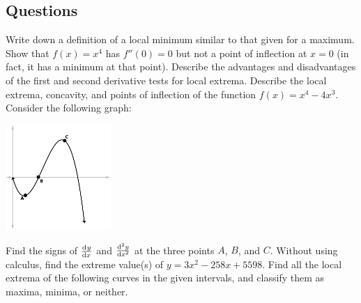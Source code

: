 \subsection*{Questions}
\begin{questions}
  \questioA Write down a definition of a local minimum similar to that given for a maximum.
  \questioA Show that $ f(x) = x^4 $ has $ f''(0) = 0 $ but not a point of inflection at $ x = 0 $ (in fact, it has a minimum at that point).
  \questioA Describe the advantages and disadvantages of the first and second derivative tests for local extrema.
  \questioM Describe the local extrema, concavity, and points of inflection of the function $ f(x) = x^4 - 4x^3 $.
  \questioA Consider the following graph:
            \begin{center}
              \includegraphics[width=0.3\textwidth]{curvature}
            \end{center}
            Find the signs of $ \od{y}{x} $ and $ \od[2]{y}{x} $ at the three points $ A $, $ B $, and $ C $.
  \questioA Without using calculus, find the extreme value(s) of $ y = 3x^2 - 258x + 5598 $.
  \questioM Find all the local extrema of the following curves in the given intervals, and classify them as maxima, minima, or neither.
\end{questions}
